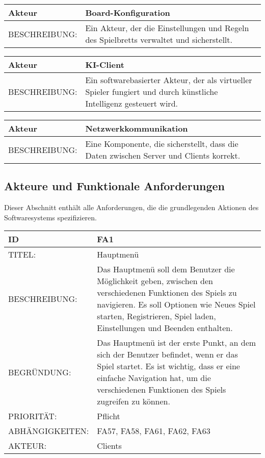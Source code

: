 \documentclass{uulm-assignment}
\begin{document}
	
	
	\begin{tabularx}{\textwidth}{|l|X |} \hline
	        \textbf{Akteur} & \textbf{Board-Konfiguration} \\
	        \hline
	        BESCHREIBUNG: &   Ein Akteur, der die Einstellungen und Regeln des Spielbretts verwaltet und sicherstellt. \\
	        \hline
	\end{tabularx}
    
    \begin{tabularx}{\textwidth}{|l|X |} \hline
	        \textbf{Akteur} & \textbf{KI-Client} \\
	        \hline
	        BESCHREIBUNG: &  Ein softwarebasierter Akteur, der als virtueller Spieler fungiert und durch künstliche Intelligenz gesteuert wird. \\
	        \hline
	\end{tabularx}
	
	\begin{tabularx}{\textwidth}{|l|X |} \hline
	        \textbf{Akteur} & \textbf{Netzwerkkommunikation} \\
	        \hline
	        BESCHREIBUNG: &    Eine Komponente, die sicherstellt, dass die Daten zwischen Server und Clients korrekt. \\
	        \hline
	\end{tabularx}

    \subsection{Akteure und Funktionale Anforderungen}

    Dieser Abschnitt enthält alle Anforderungen, die die grundlegenden Aktionen des Softwaresystems spezifizieren.

    \begin{tabularx}{\textwidth}{|l|X |} \hline
        \textbf{ID} & \textbf{FA1} \\
        \hline
        TITEL: & Hauptmenü \\
        \hline
        BESCHREIBUNG: & Das Hauptmenü soll dem Benutzer die Möglichkeit geben, zwischen den verschiedenen Funktionen des Spiels zu navigieren. Es soll Optionen wie Neues Spiel starten, Registrieren, Spiel laden, Einstellungen und Beenden enthalten.
        \\
        \hline
        BEGRÜNDUNG: &Das Hauptmenü ist der erste Punkt, an dem sich der Benutzer befindet, wenn er das Spiel startet. Es ist wichtig, dass er eine einfache Navigation hat, um die verschiedenen Funktionen des Spiels zugreifen zu können.\\
        \hline
        PRIORITÄT: & Pflicht \\
        \hline
        ABHÄNGIGKEITEN: & FA57, FA58, FA61, FA62, FA63 
         \\
         \hline
         AKTEUR: & Clients 
         \\
        \hline        
    \end{tabularx}
\end{document}

